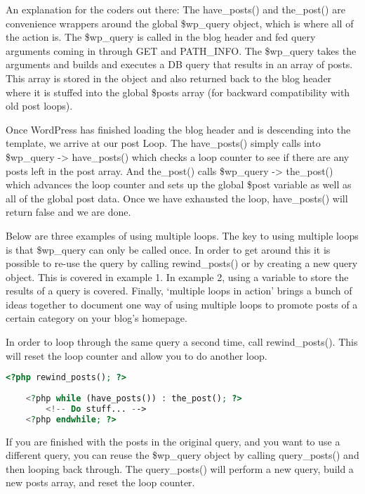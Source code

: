 An explanation for the coders out there: The have\_posts() and the\_post() are convenience wrappers around the global \$wp\_query object, which is where all of the action is. The \$wp\_query is called in the blog header and fed query arguments coming in through GET and PATH\_INFO. The \$wp\_query takes the arguments and builds and executes a DB query that results in an array of posts. This array is stored in the object and also returned back to the blog header where it is stuffed into the global \$posts array (for backward compatibility with old post loops).

Once WordPress has finished loading the blog header and is descending into the template, we arrive at our post Loop. The have\_posts() simply calls into \$wp\_query -> have\_posts() which checks a loop counter to see if there are any posts left in the post array. And the\_post() calls \$wp\_query -> the\_post() which advances the loop counter and sets up the global \$post variable as well as all of the global post data. Once we have exhausted the loop, have\_posts() will return false and we are done.


Below are three examples of using multiple loops. The key to using multiple loops is that \$wp\_query can only be called once. In order to get around this it is possible to re-use the query by calling rewind\_posts() or by creating a new query object. This is covered in example 1. In example 2, using a variable to store the results of a query is covered. Finally, `multiple loops in action' brings a bunch of ideas together to document one way of using multiple loops to promote posts of a certain category on your blog’s homepage.



In order to loop through the same query a second time, call rewind\_posts(). This will reset the loop counter and allow you to do another loop.


\begin{lstlisting}[language=PHP]
	<?php rewind_posts(); ?>
	 
	<?php while (have_posts()) : the_post(); ?>
		<!-- Do stuff... -->
	<?php endwhile; ?>
\end{lstlisting}

If you are finished with the posts in the original query, and you want to use a different query, you can reuse the \$wp\_query object by calling query\_posts() and then looping back through. The query\_posts() will perform a new query, build a new posts array, and reset the loop counter.

